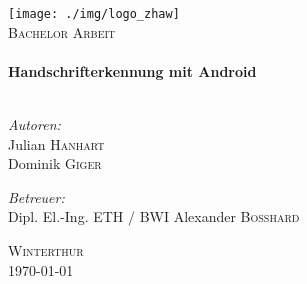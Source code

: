 \begin{titlepage}
 
\begin{center}
 
 
\texttt{[image: ./img/logo\_zhaw]}\\[2cm]
 

 
\textsc{\Large Bachelor Arbeit}\\[0.5cm]
 
 
\HRule \\[0.4cm]
{ \huge \bfseries Handschrifterkennung mit Android}\\[0.4cm]
 
\HRule \\[1.5cm]
 
\begin{minipage}{0.4\textwidth}
\begin{flushleft} \large
\emph{Autoren:}\\
Julian \textsc{Hanhart}\\
Dominik \textsc{Giger}
\end{flushleft}
\end{minipage}
\begin{minipage}{0.4\textwidth}
\begin{flushright} \large
\emph{Betreuer:} \\ 
Dipl. El.-Ing. ETH / BWI Alexander \textsc{Bosshard}\\
 
\end{flushright}
\end{minipage}
 
\vfill
 
\textsc{Winterthur}\\
{\large \today}
 
\end{center}
 
\end{titlepage}

